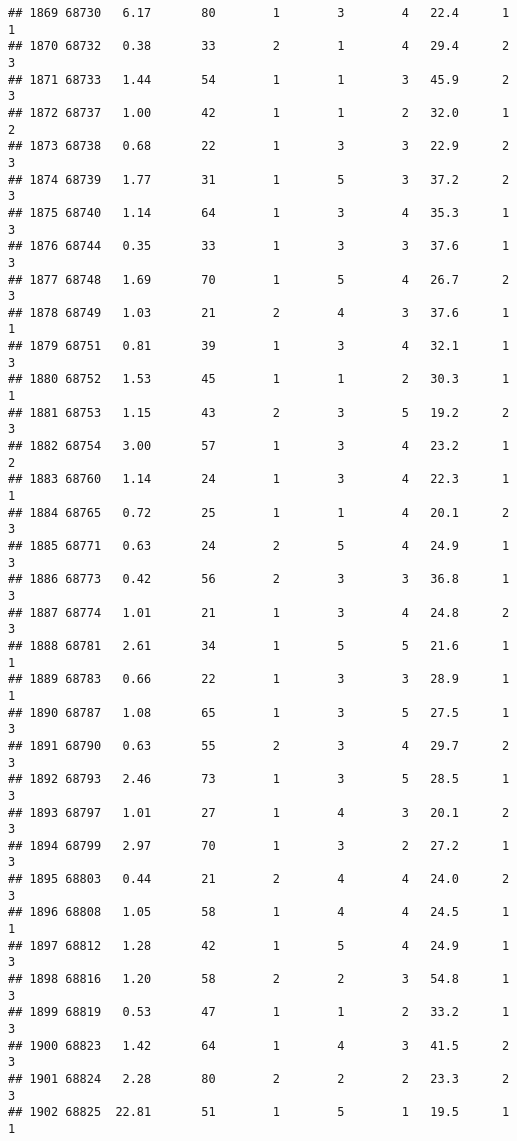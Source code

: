 \documentclass[
]{article}
\begin{document}
\begin{verbatim}
## 1869 68730   6.17       80        1        3        4   22.4      1      1
## 1870 68732   0.38       33        2        1        4   29.4      2      3
## 1871 68733   1.44       54        1        1        3   45.9      2      3
## 1872 68737   1.00       42        1        1        2   32.0      1      2
## 1873 68738   0.68       22        1        3        3   22.9      2      3
## 1874 68739   1.77       31        1        5        3   37.2      2      3
## 1875 68740   1.14       64        1        3        4   35.3      1      3
## 1876 68744   0.35       33        1        3        3   37.6      1      3
## 1877 68748   1.69       70        1        5        4   26.7      2      3
## 1878 68749   1.03       21        2        4        3   37.6      1      1
## 1879 68751   0.81       39        1        3        4   32.1      1      3
## 1880 68752   1.53       45        1        1        2   30.3      1      1
## 1881 68753   1.15       43        2        3        5   19.2      2      3
## 1882 68754   3.00       57        1        3        4   23.2      1      2
## 1883 68760   1.14       24        1        3        4   22.3      1      1
## 1884 68765   0.72       25        1        1        4   20.1      2      3
## 1885 68771   0.63       24        2        5        4   24.9      1      3
## 1886 68773   0.42       56        2        3        3   36.8      1      3
## 1887 68774   1.01       21        1        3        4   24.8      2      3
## 1888 68781   2.61       34        1        5        5   21.6      1      1
## 1889 68783   0.66       22        1        3        3   28.9      1      1
## 1890 68787   1.08       65        1        3        5   27.5      1      3
## 1891 68790   0.63       55        2        3        4   29.7      2      3
## 1892 68793   2.46       73        1        3        5   28.5      1      3
## 1893 68797   1.01       27        1        4        3   20.1      2      3
## 1894 68799   2.97       70        1        3        2   27.2      1      3
## 1895 68803   0.44       21        2        4        4   24.0      2      3
## 1896 68808   1.05       58        1        4        4   24.5      1      1
## 1897 68812   1.28       42        1        5        4   24.9      1      3
## 1898 68816   1.20       58        2        2        3   54.8      1      3
## 1899 68819   0.53       47        1        1        2   33.2      1      3
## 1900 68823   1.42       64        1        4        3   41.5      2      3
## 1901 68824   2.28       80        2        2        2   23.3      2      3
## 1902 68825  22.81       51        1        5        1   19.5      1      1

\end{verbatim}
\end{document}

